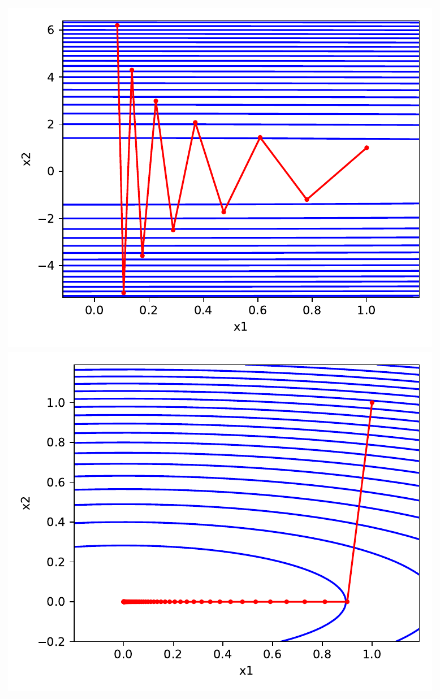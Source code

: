 \documentclass{article}
\begin{document}
\begin{enumerate}[(a).]
\begin{figure}[h]
\begin{minipage}[b]{0.23\linewidth}
			\includegraphics[width=1\linewidth]{gd_traces_gamma0.1_ss2.2.pdf}\vspace{4pt}
		\includegraphics[width=1\linewidth]{gd_traces_gamma0.1_ss1.pdf}
		\end{minipage}
		\begin{minipage}[b]{0.23\linewidth}

\end{minipage}
\end{figure}
\end{enumerate}
\end{document}
